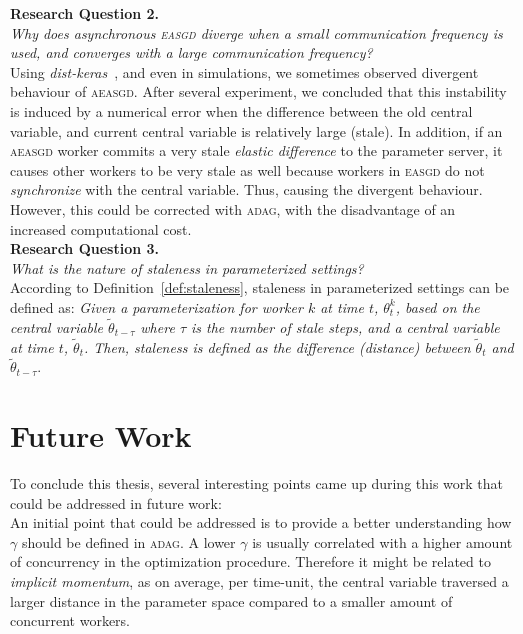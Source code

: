 \noindent \textbf{Research Question 2.}\\
\emph{Why does asynchronous \textsc{easgd} diverge when a small communication frequency is used, and converges with a large communication frequency?}\\

Using \emph{dist-keras}~\cite{dist_keras}, and even in simulations, we sometimes observed divergent behaviour of \textsc{aeasgd}. After several experiment, we concluded that this instability is induced by a numerical error when the difference between the old central variable, and current central variable is relatively large (stale). In addition, if an \textsc{aeasgd} worker commits a very stale \emph{elastic difference} to the parameter server, it causes other workers to be very stale as well because workers in \textsc{easgd} do not \emph{synchronize} with the central variable. Thus, causing the divergent behaviour. However, this could be corrected with \textsc{adag}, with the disadvantage of an increased computational cost.\\

\noindent \textbf{Research Question 3.}\\
\emph{What is the nature of staleness in parameterized settings?}\\

According to Definition~\ref{def:staleness}, staleness in parameterized settings can be defined as: \emph{Given a parameterization for worker $k$ at time $t$, $\theta^k_t$, based on the central variable $\tilde{\theta}_{t - \tau}$ where $\tau$ is the number of stale steps, and a central variable at time $t$, $\tilde{\theta}_t$. Then, staleness is defined as the difference (distance) between $\tilde{\theta}_t$ and $\tilde{\theta}_{t-\tau}$}.

\section{Future Work}
\label{sec:conclusion_future_work}

To conclude this thesis, several interesting points came up during this work that could be addressed in future work:\\

An initial point that could be addressed is to provide a better understanding how $\gamma$ should be defined in \textsc{adag}. A lower $\gamma$ is usually correlated with a higher amount of concurrency in the optimization procedure. Therefore it might be related to \emph{implicit momentum}, as on average, per time-unit, the central variable traversed a larger distance in the parameter space compared to a smaller amount of concurrent workers.\\

